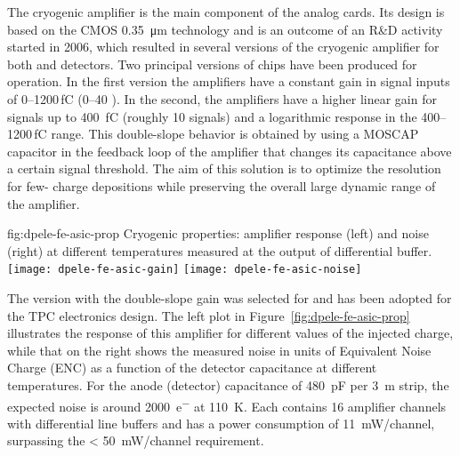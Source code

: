 The cryogenic amplifier  is the main component of the  analog cards. Its design is based on the CMOS \SI{0.35}{\micro\meter} technology and is an outcome of an R\&D  activity started in 2006, which resulted in several versions of the cryogenic amplifier for both \single and \dual {} detectors. Two principal versions of  chips have been produced for \dual {} operation. In the first version the amplifiers have a constant gain in signal inputs of \numrange{0}{1200}\,\si{\femto\coulomb} (\numrange{0}{40} ). In the second, the amplifiers have a higher linear gain for signals up to \SI{400}{\femto\coulomb} (roughly \num{10}  signals) and a logarithmic response in the \numrange{400}{1200}\,\si{\femto\coulomb} range. This double-slope behavior is obtained by using a MOSCAP capacitor in the feedback loop of the amplifier that changes its capacitance above a certain signal threshold. The aim of this solution is to optimize the resolution for few- charge depositions while preserving the overall large dynamic range of the amplifier.

\begin{dunefigure}{fig:dpele-fe-asic-prop}
{Cryogenic   properties: amplifier response (left) and noise (right) at different temperatures measured at the output of differential buffer.}
\texttt{[image: dpele-fe-asic-gain]}
\texttt{[image: dpele-fe-asic-noise]}
\end{dunefigure}

The  version with the double-slope gain was selected for  and has been adopted for the \dual TPC electronics design. The left plot in Figure~\ref{fig:dpele-fe-asic-prop} illustrates the response of this amplifier for different values of the injected charge, while that on the right shows the measured noise in units of Equivalent Noise Charge (ENC) as a function of the detector capacitance at different temperatures. 
For the  anode (detector) capacitance of \SI{480}{\pico\farad} per \SI{3}{\metre} strip, the expected noise is around \SI{2000}{e^{-}} at \SI{110}{\kelvin}. Each  contains \num{16} amplifier channels with differential line buffers and has a power consumption of \SI{11}{\milli\watt/channel}, surpassing the \SI{< 50}{\milli\watt/channel} requirement. 

